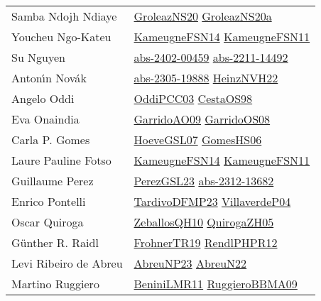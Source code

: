 {\begin{longtable}{p{4cm}p{20cm}}
Samba Ndojh Ndiaye & \href{papers/GroleazNS20.pdf}{GroleazNS20}\cite{GroleazNS20} \href{papers/GroleazNS20a.pdf}{GroleazNS20a}\cite{GroleazNS20a} \\
Youcheu Ngo{-}Kateu & \href{articles/KameugneFSN14.pdf}{KameugneFSN14}\cite{KameugneFSN14} \href{papers/KameugneFSN11.pdf}{KameugneFSN11}\cite{KameugneFSN11} \\
Su Nguyen & \href{articles/abs-2402-00459.pdf}{abs-2402-00459}\cite{abs-2402-00459} \href{articles/abs-2211-14492.pdf}{abs-2211-14492}\cite{abs-2211-14492} \\
Anton{\'{\i}}n Nov{\'{a}}k & \href{articles/abs-2305-19888.pdf}{abs-2305-19888}\cite{abs-2305-19888} \href{articles/HeinzNVH22.pdf}{HeinzNVH22}\cite{HeinzNVH22} \\
Angelo Oddi & \href{papers/OddiPCC03.pdf}{OddiPCC03}\cite{OddiPCC03} \href{papers/CestaOS98.pdf}{CestaOS98}\cite{CestaOS98} \\
Eva Onaindia & \href{articles/GarridoAO09.pdf}{GarridoAO09}\cite{GarridoAO09} \href{articles/GarridoOS08.pdf}{GarridoOS08}\cite{GarridoOS08} \\
Carla P. Gomes & \href{papers/HoeveGSL07.pdf}{HoeveGSL07}\cite{HoeveGSL07} \href{papers/GomesHS06.pdf}{GomesHS06}\cite{GomesHS06} \\
Laure Pauline Fotso & \href{articles/KameugneFSN14.pdf}{KameugneFSN14}\cite{KameugneFSN14} \href{papers/KameugneFSN11.pdf}{KameugneFSN11}\cite{KameugneFSN11} \\
Guillaume Perez & \href{papers/PerezGSL23.pdf}{PerezGSL23}\cite{PerezGSL23} \href{articles/abs-2312-13682.pdf}{abs-2312-13682}\cite{abs-2312-13682} \\
Enrico Pontelli & \href{papers/TardivoDFMP23.pdf}{TardivoDFMP23}\cite{TardivoDFMP23} \href{}{VillaverdeP04}\cite{VillaverdeP04} \\
Oscar Quiroga & \href{articles/ZeballosQH10.pdf}{ZeballosQH10}\cite{ZeballosQH10} \href{papers/QuirogaZH05.pdf}{QuirogaZH05}\cite{QuirogaZH05} \\
G{\"{u}}nther R. Raidl & \href{papers/FrohnerTR19.pdf}{FrohnerTR19}\cite{FrohnerTR19} \href{papers/RendlPHPR12.pdf}{RendlPHPR12}\cite{RendlPHPR12} \\
Levi Ribeiro de Abreu & \href{}{AbreuNP23}\cite{AbreuNP23} \href{articles/AbreuN22.pdf}{AbreuN22}\cite{AbreuN22} \\
Martino Ruggiero & \href{articles/BeniniLMR11.pdf}{BeniniLMR11}\cite{BeniniLMR11} \href{articles/RuggieroBBMA09.pdf}{RuggieroBBMA09}\cite{RuggieroBBMA09} \\

\end{longtable}}

